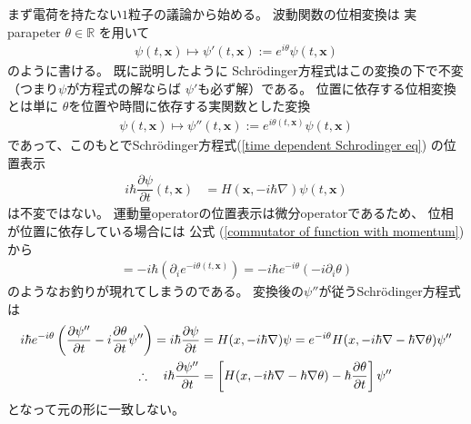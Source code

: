 まず電荷を持たない$1$粒子の議論から始める。
波動関数の位相変換は
実parapeter $\theta \in \mathbb{R}$
を用いて
\begin{align}
    \psi (t, \bm{x})
\mapsto
    \psi' (t, \bm{x})
:=
    e^{i \theta} \psi (t, \bm{x})
\end{align}
のように書ける。
既に説明したように
Schr\"odinger方程式はこの変換の下で不変
（つまり$\psi$が方程式の解ならば
$\psi'$も必ず解）である。
位置に依存する位相変換とは単に
$\theta$を位置や時間に依存する実関数とした変換
\begin{align}
    \psi (t, \bm{x})
\mapsto
    \psi'' (t, \bm{x})
:=
    e^{i \theta(t, \bm{x})}
    \psi (t, \bm{x})
\end{align}
であって、このもとでSchr\"odinger方程式(\ref{time dependent Schrodinger eq})
の位置表示
\begin{align}
    i\hbar
    \dfrac{\partial \psi}{\partial t}
    (t, \bm{x})
&=
    H (\bm{x}, -i \hbar \nabla)
    \psi (t, \bm{x})
\end{align}
は不変ではない。
運動量operatorの位置表示は微分operatorであるため、
位相が位置に依存している場合には
公式
(\ref{commutator of function with momentum})
から
\begin{align}
    [- i \hbar \partial_i,
    e^{- i \theta(t, \bm{x})} ]
=
    - i \hbar (\partial_i
    e^{- i \theta(t, \bm{x})} )
=
    - i \hbar e^{- i \theta}
    (- i \partial_i \theta)
\end{align}
のようなお釣りが現れてしまうのである。
変換後の$\psi''$が従うSchr\"odinger方程式は
\begin{align}
    i\hbar
    e^{- i \theta}
    \left(
        \dfrac{\partial \psi''}
        {\partial t}
    -
        i
        \dfrac{\partial \theta}
        {\partial t}
        \psi''
    \right)
=
    i \hbar
    \dfrac{\partial \psi}{\partial t}
&=
    H (x, - i \hbar \nabla) \psi
=
    e^{- i \theta}
    H (x, - i \hbar \nabla
    - \hbar \nabla \theta )
    \psi''
\notag\\ \therefore \quad
    i\hbar
    \dfrac{\partial \psi''}{\partial t}
&=
    \left[
        H (x, - i \hbar
        \nabla - \hbar \nabla \theta)
    - \hbar
        \dfrac{\partial \theta}{\partial t}
    \right]
    \psi''
\end{align}
となって元の形に一致しない。

